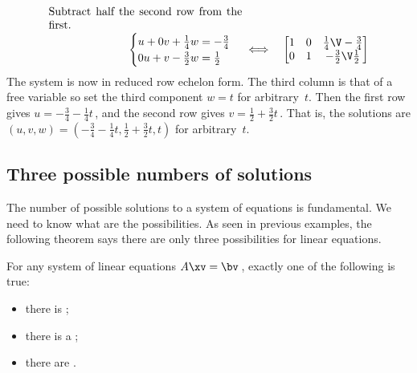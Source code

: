 \begin{example}
\begin{solution}
\begin{eqnarray*}
\\
\parbox{0.5\linewidth}{Subtract half the second row from the first.}
\\
\begin{cases}
u+0v+\frac14w=-\frac34\\0u+v-\frac32w=\frac12
\end{cases}
&\iff&%
\begin{bmatrix} 1&0&\frac14\V-\frac34\\0&1&-\frac32\V\frac12 \end{bmatrix}
\end{eqnarray*}
The system is now in reduced row echelon form.  
The third column is that of a free variable so set the third component \(w=t\) for arbitrary~\(t\).
Then the first row gives \(u=-\frac34-\frac14t\)\,, and the second row gives \(v=\frac12+\frac32t\)\,.
That is, the solutions are \((u,v,w)=(-\frac34-\frac14t,\frac12+\frac32t,t)\) for arbitrary~\(t\).
\end{solution}
\end{example}




\subsection{Three possible numbers of solutions}
\label{sec:3pns}

The number of possible solutions to a system of equations is fundamental.  
We need to know what are the possibilities.
As seen in previous examples, the following theorem says there are only three possibilities for linear equations.

\begin{theorem} \label{thm:fred}
For any system of linear equations \(A\xv=\bv\)\,, exactly one of the following is true:
\begin{itemize}
\item there is ;
\item there is a ;
\item there are .
\end{itemize}
\end{theorem}


